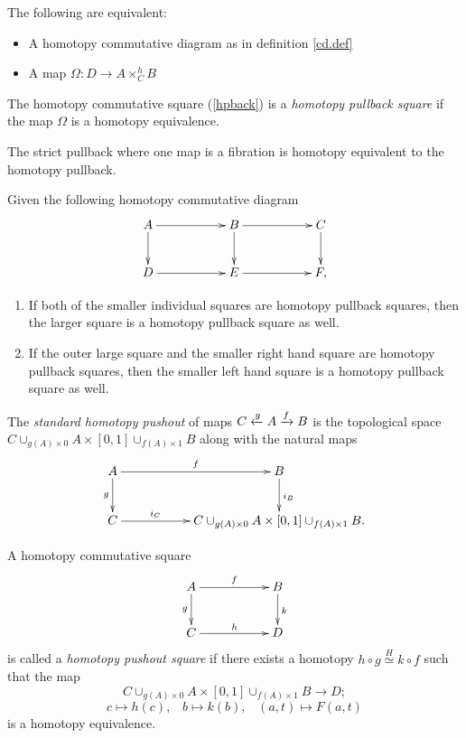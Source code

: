 \begin{prop} \label{diagram.to.map}
The following are equivalent:
\begin{itemize}
\item A homotopy commutative diagram as in definition \ref{cd.def}
\item A map $\Omega : D \rightarrow A \times_{C}^{h} B $
\end{itemize}
\end{prop}

\begin{definition}
The homotopy commutative square (\ref{hpback}) is a \textit{homotopy pullback square} if the map $\Omega$ is a homotopy equivalence. 
\end{definition}


\begin{prop}
The strict pullback where one map is a fibration is homotopy equivalent to the homotopy pullback.
\end{prop}


\begin{prop}
Given the following homotopy commutative diagram
\[
\xymatrix{
A \ar[rr]^-{} \ar[d]_-{}
&&
B \ar[rr]^{} \ar[d]_-{}
&&
C \ar[d]^{}
\\
D \ar[rr]^{}
&&
E \ar[rr]^{}
&&
F,
}
\]
\begin{enumerate}
\item If both of the smaller individual squares are homotopy pullback squares, then the larger square is a homotopy pullback square as well.
\item If the outer large square and the smaller right hand square are homotopy pullback squares, then the smaller left hand square is a homotopy pullback square as well.
\end{enumerate}
\end{prop}



\begin{definition}
The \textit{standard homotopy pushout} of maps $C \xleftarrow{g} A \xrightarrow{f} B$ is the topological space $C \cup_{g(A) \times 0} A \times [0, 1] \cup_{f(A) \times 1} B$ along with the natural maps
\[
\xymatrix{
A \ar[rr]^-{f} \ar[d]_-{g}
&&
B \ar[d]^{i_{B}}
\\
C \ar[rr]^-{i_{C}}
&&
C \cup_{g(A) \times 0} A \times [0, 1] \cup_{f(A) \times 1} B.
}
\]
\end{definition}
\begin{definition}
A homotopy commutative square
\[
\xymatrix{
A \ar[rr]^-{f} \ar[d]_-{g}
&&
B \ar[d]^{k}
\\
C \ar[rr]^{h}
&&
D
}
\]
is called a \textit{homotopy pushout square} if there exists a homotopy $h \circ g \overset{H} \simeq k \circ f$ such that the map
\begin{equation}
C \cup_{g(A) \times 0} A \times [0, 1] \cup_{f(A) \times 1} B \longrightarrow D; 
\end{equation}
\[
c \mapsto h(c), \hspace{10pt} b \mapsto k(b), \hspace{10pt} (a, t) \mapsto F(a, t)
\]
is a homotopy equivalence.
\end{definition}

